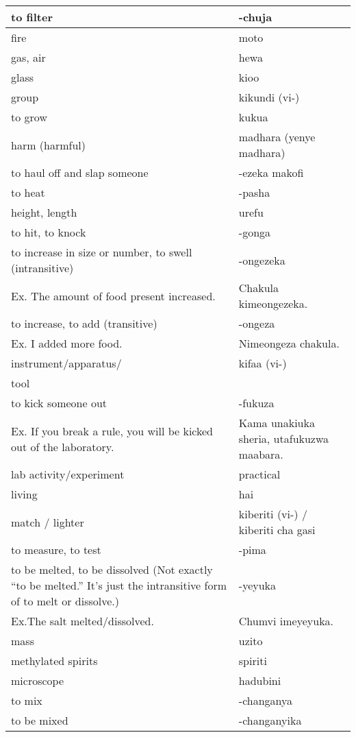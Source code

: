 \begin{center}
\begin{longtable}{|p{7cm}|p{7cm}|}
to filter	&	-chuja	\\	\hline
fire	&	moto	\\	\hline
gas, air	&	hewa	\\	\hline
glass	&	kioo	\\	\hline
group	&	kikundi (vi-)	\\	\hline
to grow	&	kukua	\\	\hline
harm (harmful)	&	madhara (yenye madhara)	\\	\hline
to haul off and slap someone	&	-ezeka makofi	\\	\hline
to heat	&	-pasha	\\	\hline
height, length	&	urefu	\\	\hline
to hit, to knock	&	-gonga	\\	\hline
to increase in size or number, to swell (intransitive)	&	-ongezeka	\\	
        Ex. The amount of food present increased.	&	        Chakula kimeongezeka.	\\	\hline
to increase, to add (transitive)	&	-ongeza	\\	
        Ex. I added more food.	&	        Nimeongeza chakula.	\\	\hline
instrument/apparatus/	&	kifaa (vi-)	\\	\hline
tool	&		\\	\hline
to kick someone out     	&	-fukuza 	\\	
        Ex. If you break a rule, you will be kicked out     of the laboratory.	&	Kama unakiuka sheria, utafukuzwa maabara.	\\	\hline
lab activity/experiment	&	practical	\\	\hline
living	&	hai	\\	\hline
match / lighter	&	kiberiti (vi-) / kiberiti cha gasi	\\	\hline
to measure, to test	&	-pima	\\	\hline
to be melted, to be dissolved (Not exactly “to be melted.” It's just the intransitive form of to melt or dissolve.)	&	-yeyuka 	\\	
        Ex.The salt melted/dissolved.	&	        Chumvi imeyeyuka.	\\	\hline
mass	&	uzito	\\	\hline
methylated spirits	&	spiriti	\\	\hline
microscope	&	hadubini	\\	\hline
to mix	&	-changanya	\\	\hline
to be mixed	&	-changanyika	\\	\hline

\end{longtable}
\end{center}
